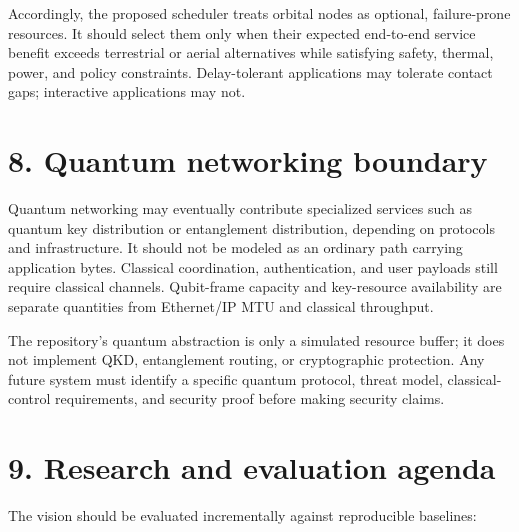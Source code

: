 \documentclass[
  american,
  11pt,
]{article}
\begin{document}
Accordingly, the proposed scheduler treats orbital nodes as optional,
failure-prone resources. It should select them only when their expected
end-to-end service benefit exceeds terrestrial or aerial alternatives
while satisfying safety, thermal, power, and policy constraints.
Delay-tolerant applications may tolerate contact gaps; interactive
applications may not.

\section{8. Quantum networking
boundary}\label{quantum-networking-boundary}

Quantum networking may eventually contribute specialized services such
as quantum key distribution or entanglement distribution, depending on
protocols and infrastructure. It should not be modeled as an ordinary
path carrying application bytes. Classical coordination, authentication,
and user payloads still require classical channels. Qubit-frame capacity
and key-resource availability are separate quantities from Ethernet/IP
MTU and classical throughput.

The repository's quantum abstraction is only a simulated resource
buffer; it does not implement QKD, entanglement routing, or
cryptographic protection. Any future system must identify a specific
quantum protocol, threat model, classical-control requirements, and
security proof before making security claims.

\section{9. Research and evaluation
agenda}\label{research-and-evaluation-agenda}

The vision should be evaluated incrementally against reproducible
baselines:
\end{document}
